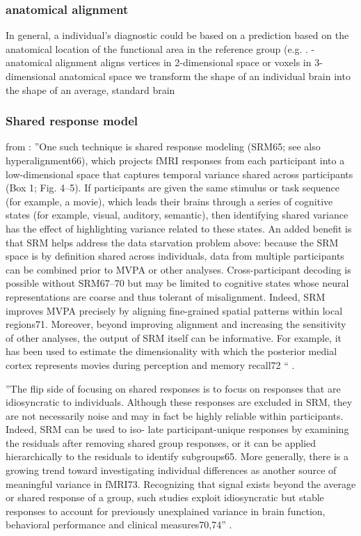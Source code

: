 \subsubsection{anatomical alignment}

In general, a individual's diagnostic could be based on a prediction based on
the anatomical location of the functional area in the reference group (e.g.
\citet{weiner2018defining}.
%
- anatomical alignment aligns vertices in 2-dimensional space or voxels in
3-dimensional anatomical space
%
we transform the shape of an individual brain into the shape of an average,
standard brain

\subsubsection{Shared response model}

from \citep{cohen2017computational}: ''One such technique is shared response
modeling (SRM65; see also hyperalignment66), which projects fMRI responses from
each participant into a low-dimensional space that captures temporal variance
shared across participants (Box 1; Fig. 4–5).
%
If participants are given the same stimulus or task sequence (for example, a
movie), which leads their brains through a series of cognitive states (for
example, visual, auditory, semantic), then identifying shared variance has the
effect of highlighting variance related to these states.
%
An added benefit is that SRM helps address the data starvation problem above:
because the SRM space is by definition shared across individuals, data from
multiple participants can be combined prior to MVPA or other analyses.
%
Cross-participant decoding is possible without SRM67–70 but may be limited to
cognitive states whose neural representations are coarse and thus tolerant of
misalignment.
%
Indeed, SRM improves MVPA precisely by aligning fine-grained spatial patterns
within local regions71.
%
Moreover, beyond improving alignment and increasing the sensitivity of other
analyses, the output of SRM itself can be informative.
%
For example, it has been used to estimate the dimensionality with which the
posterior medial cortex represents movies during perception and memory recall72
`` \citep{cohen2017computational}.

%
''The flip side of focusing on shared responses is to focus on responses that
are idiosyncratic to individuals.
%
Although these responses are excluded in SRM, they are not necessarily noise and
may in fact be highly reliable within participants.
%
Indeed, SRM can be used to iso- late participant-unique responses by examining
the residuals after removing shared group responses, or it can be applied
hierarchically to the residuals to identify subgroups65.
%
More generally, there is a growing trend toward investigating individual
differences as another source of meaningful variance in fMRI73.
%
Recognizing that signal exists beyond the average or shared response of a group,
such studies exploit idiosyncratic but stable responses to account for
previously unexplained variance in brain function, behavioral performance and
clinical measures70,74'' \citep{cohen2017computational}.

